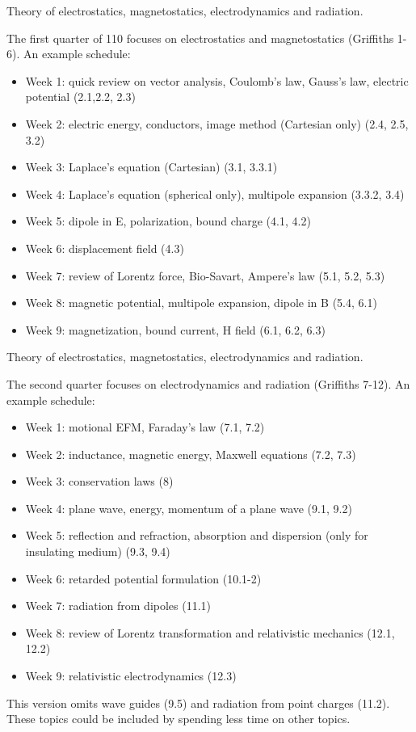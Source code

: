 \documentclass[12pt]{article}
\begin{document}
\vskip 1cm
Theory of electrostatics, magnetostatics, electrodynamics and radiation.

The first quarter of 110 focuses on electrostatics and magnetostatics
(Griffiths 1-6).  An example schedule:
\begin{itemize}
\item Week 1: quick review on vector analysis, Coulomb's law, Gauss's law, electric potential (2.1,2.2, 2.3)
\item Week 2: electric energy, conductors, image method (Cartesian only) (2.4, 2.5, 3.2)
\item Week 3: Laplace's equation (Cartesian) (3.1, 3.3.1)
\item Week 4: Laplace's equation (spherical only), multipole expansion (3.3.2, 3.4)
\item Week 5: dipole in E, polarization, bound charge (4.1, 4.2)
\item Week 6: displacement field (4.3)
\item Week 7: review of Lorentz force, Bio-Savart, Ampere's law (5.1, 5.2, 5.3)
\item Week 8: magnetic potential, multipole expansion, dipole in B (5.4, 6.1)
\item Week 9: magnetization, bound current, H field (6.1, 6.2, 6.3)
\end{itemize}

Theory of electrostatics, magnetostatics, electrodynamics and radiation.

The second quarter focuses on electrodynamics and radiation (Griffiths 7-12).
An example schedule:
\begin{itemize}
\item Week 1: motional EFM, Faraday's law (7.1, 7.2)
\item Week 2: inductance, magnetic energy, Maxwell equations (7.2, 7.3)
\item Week 3: conservation laws (8)
\item Week 4: plane wave, energy, momentum of a plane wave (9.1, 9.2)
\item Week 5: reflection and refraction, absorption and dispersion (only for insulating medium) (9.3, 9.4)
\item Week 6: retarded potential formulation (10.1-2)
\item Week 7: radiation from dipoles (11.1)
\item Week 8: review of Lorentz transformation and relativistic mechanics (12.1, 12.2)
\item Week 9: relativistic electrodynamics (12.3)
\end{itemize}
This version omits wave guides (9.5) and radiation from point charges
(11.2).  These topics could be included by spending less time on other
topics.
\newpage
\end{document}
